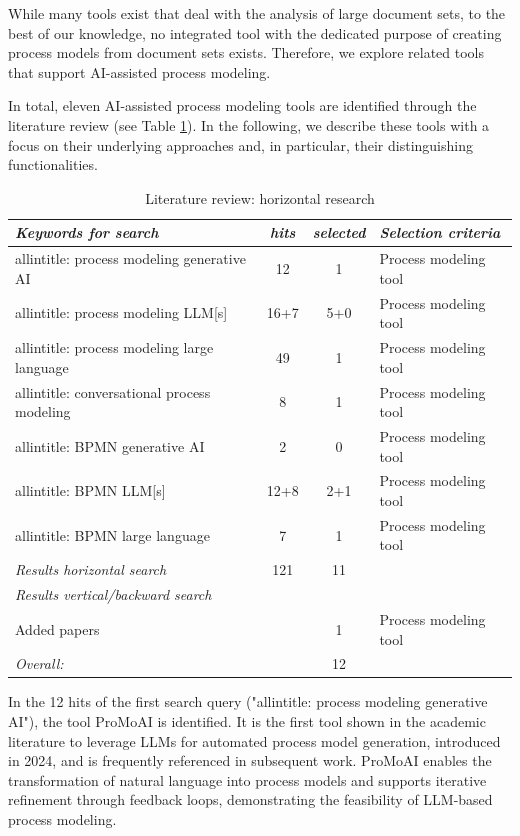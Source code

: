 While many tools exist that deal with the analysis of large document sets, to the best of our knowledge, no integrated tool with the dedicated purpose of creating process models from document sets exists. Therefore, we explore related tools that support AI-assisted process modeling.

In total, eleven AI-assisted process modeling tools are identified through the literature review (see Table \ref{tab:lr_search}). In the following, we describe these tools with a focus on their underlying approaches and, in particular, their distinguishing functionalities.

\begin{table}[htb!]
    \centering
    \caption{Literature review: horizontal research}
    \label{tab:lr_search}
    \begin{tabular}{lccl}
        \textit{Keywords for search} & \textit{hits} & \textit{selected} & \textit{Selection criteria}\\
        \hline
        allintitle: process modeling generative AI & 12 & 1 & Process modeling tool\\
        allintitle: process modeling LLM[s] & 16+7 & 5+0 & Process modeling tool\\ 
        allintitle: process modeling large language & 49 & 1 & Process modeling tool\\
        allintitle: conversational process modeling & 8 & 1 & Process modeling tool\\
        allintitle: BPMN generative AI & 2 & 0 & Process modeling tool\\ 
        allintitle: BPMN LLM[s]& 12+8 & 2+1 & Process modeling tool\\
        allintitle: BPMN large language& 7 & 1 &Process modeling tool\\
        \textit{Results horizontal search} & 121 & 11 & \\
        \textit{Results vertical/backward search} &  & & \\
        Added papers &  & 1& Process modeling tool \\
        \textit{Overall:} &  & 12 & \\
        \hline
    \end{tabular}
\end{table}


In the 12 hits of the first search query ("allintitle: process modeling generative AI"), the tool ProMoAI \cite{kourani2024promoai} is identified. It is the first tool shown in the academic literature to leverage LLMs for automated
process model generation, introduced in 2024, and is frequently referenced in subsequent work.
ProMoAI enables the transformation of natural language into process models and supports iterative
refinement through feedback loops, demonstrating the feasibility of LLM-based process modeling.

